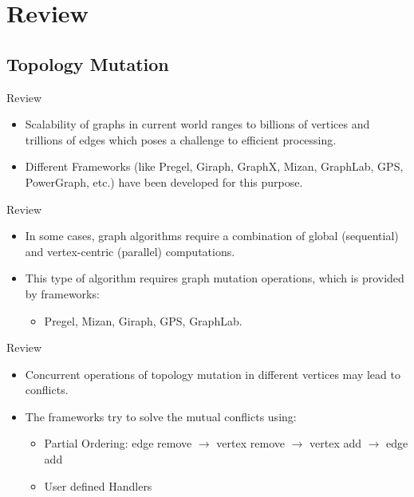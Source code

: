 \section{Review}
\subsection{Topology Mutation}
\begin{frame}{Review}
  \begin{itemize}
    \item Scalability of graphs in current world ranges to billions of vertices and trillions of edges which poses a challenge to efficient processing.
    \item Different Frameworks (like Pregel, Giraph, GraphX, Mizan, GraphLab, GPS, PowerGraph, etc.) have been developed for this purpose.
  \end{itemize}
  \end{frame}

  \begin{frame}{Review}
    \begin{itemize}
    \item In some cases, graph algorithms require a combination of global (sequential) and vertex-centric (parallel) computations.
    \item This type of algorithm requires graph mutation operations, which is provided by frameworks:
        \begin{itemize}
          \item Pregel, Mizan, Giraph, GPS, GraphLab.
        \end{itemize}
      \end{itemize}
    \end{frame}

    \begin{frame}{Review}
    \begin{itemize}
      \item Concurrent operations of topology mutation in different vertices may lead to conflicts.
      \item The frameworks try to solve the mutual conflicts using:
          \begin{itemize}
            \item Partial Ordering: edge remove $\rightarrow$ vertex remove $\rightarrow$ vertex add $\rightarrow$ edge add
            \item User defined Handlers
          \end{itemize}
  \end{itemize}
\end{frame}
